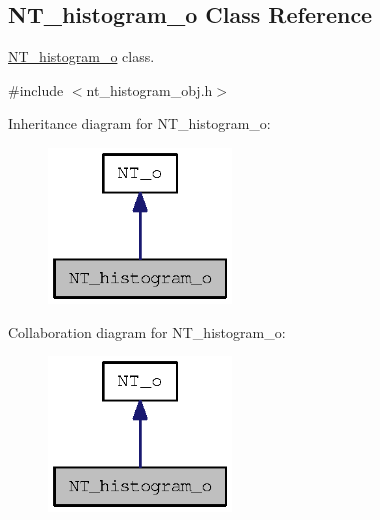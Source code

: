 \subsection{NT\_\-histogram\_\-o Class Reference}
\label{class_n_t__histogram__o}


\hyperlink{class_n_t__histogram__o}{NT\_\-histogram\_\-o} class.  




{\ttfamily \#include $<$nt\_\-histogram\_\-obj.h$>$}



Inheritance diagram for NT\_\-histogram\_\-o:
\nopagebreak
\begin{figure}[H]
\begin{center}
\leavevmode
\includegraphics[width=138pt]{class_n_t__histogram__o__inherit__graph}
\end{center}
\end{figure}


Collaboration diagram for NT\_\-histogram\_\-o:
\nopagebreak
\begin{figure}[H]
\begin{center}
\leavevmode
\includegraphics[width=138pt]{class_n_t__histogram__o__coll__graph}
\end{center}
\end{figure}
